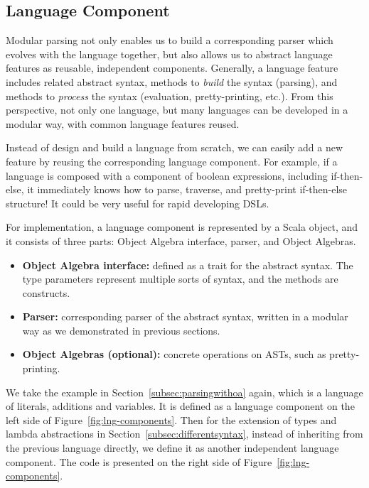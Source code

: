 

\subsection{Language Component}

Modular parsing not only enables us to build a corresponding parser which evolves with the language together, but also allows us to abstract language features as reusable, independent components. Generally, a language feature includes related abstract syntax, methods to \textit{build} the syntax (parsing), and methods to \textit{process} the syntax (evaluation, pretty-printing, etc.). From this perspective, not only one language, but many languages can be developed in a modular way, with common language features reused.

Instead of design and build a language from scratch, we can easily add a new feature by reusing the corresponding language component. For example, if a language is composed with a component of boolean expressions, including if-then-else, it immediately knows how to parse, traverse, and pretty-print if-then-else structure! It could be very useful for rapid developing DSLs.

For implementation, a language component is represented by a Scala object, and it consists of three parts: Object Algebra interface, parser, and Object Algebras.

\begin{itemize}
    \item \textbf{Object Algebra interface:} defined as a trait for the abstract syntax. The type parameters represent multiple sorts of syntax, and the methods are constructs.
    \item \textbf{Parser:} corresponding parser of the abstract syntax, written in a modular way as we demonstrated in previous sections.
    \item \textbf{Object Algebras (optional):} concrete operations on ASTs, such as pretty-printing.
\end{itemize}

We take the example in Section~\ref{subsec:parsingwithoa} again, which is a language of literals, additions and variables. It is defined as a
language component on the left side of Figure~\ref{fig:lng-components}.
Then for the extension of types and lambda abstractions in Section~\ref{subsec:differentsyntax}, instead of inheriting from the previous language directly, we define it as another independent language component. The code is presented on the right side of Figure~\ref{fig:lng-components}.

